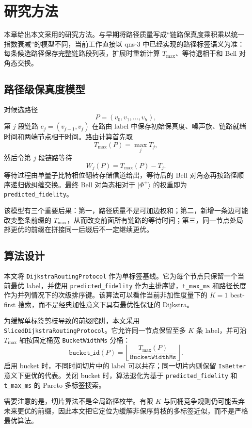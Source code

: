 
\chapter{研究方法}

本章给出本文采用的研究方法。与早期将路径质量写成“链路保真度乘积乘以统一指数衰减”的模型不同，当前工作直接以 qns-3 中已经实现的路径标签语义为准：每条候选路径保存完整链路段列表，扩展时重新计算 $T_{\max}$、等待退相干和 Bell 对角态交换。

\section{路径级保真度模型}

对候选路径
\[
P=(v_0,v_1,\ldots,v_h),
\]
第 $j$ 段链路 $e_j=(v_{j-1},v_j)$ 在路由 label 中保存初始保真度、噪声族、链路就绪时间和两端节点相干时间。路由计算首先取
\[
T_{\max}(P)=\max_j T_j,
\]
然后令第 $j$ 段链路等待
\[
W_j(P)=T_{\max}(P)-T_j.
\]
等待过程由单量子比特相位翻转存储信道给出，等待后的 Bell 对角态再按路径顺序递归做纠缠交换。最终 Bell 对角态相对于 $\vert\Phi^+\rangle$ 的权重即为 \texttt{predicted\_fidelity}。

该模型有三个重要后果：第一，路径质量不是可加边权和；第二，新增一条边可能改变整条前缀的 $T_{\max}$，从而改变前面所有链路的等待时间；第三，同一节点处局部更优的前缀在拼接同一后缀后不一定继续更优。

\section{算法设计}

本文将 \texttt{DijkstraRoutingProtocol} 作为单标签基线。它为每个节点只保留一个当前最优 label，并使用 \texttt{predicted\_fidelity} 作为主排序键，\texttt{t\_max\_ms} 和路径长度作为并列情况下的次级排序键。该算法可以看作当前非加性度量下的 $K=1$ best-first 搜索，而不是经典加性意义下具有最优性保证的 Dijkstra。

为缓解单标签剪枝导致的前缀陷阱，本文采用 \texttt{SlicedDijkstraRoutingProtocol}。它允许同一节点保留至多 $K$ 条 label，并可沿 $T_{\max}$ 轴按固定桶宽 \texttt{BucketWidthMs} 分桶：
\[
\texttt{bucket\_id}(P)
=
\left\lfloor \frac{T_{\max}(P)}{\texttt{BucketWidthMs}} \right\rfloor .
\]
启用 bucket 时，不同时间切片中的 label 可以共存；同一切片内则保留 \texttt{IsBetter} 意义下更优的代表。关闭 bucket 时，算法退化为基于 \texttt{predicted\_fidelity} 和 \texttt{t\_max\_ms} 的 Pareto 多标签搜索。

需要注意的是，切片算法不是全局路径枚举。有限 $K$ 与同桶竞争规则仍可能丢弃未来更优的前缀，因此本文把它定位为缓解非保序剪枝的多标签近似，而不是严格最优算法。


